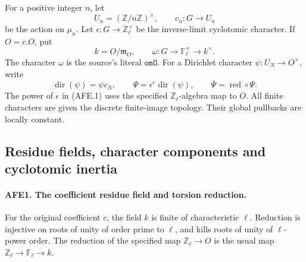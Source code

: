 For a positive integer \(n\), let
\[
 U_n=(\mathbb Z/n\mathbb Z)^\times,\qquad
 c_n:G\longrightarrow U_n
\]
be the action on \(\mu_n\).  Let
\(\epsilon:G\to\mathbb Z_\ell^\times\) be the inverse-limit
cyclotomic character.  If \(O=c.O\), put
\[
 k=O/\mathfrak m_O,\qquad
 \omega:G\longrightarrow\mathbb F_\ell^\times
                         \longrightarrow k^\times .
\]
The character \(\omega\) is the source's literal
\(\texttt{omO}\).  For a Dirichlet character
\(\psi:U_N\to O^\times\), write
\[
 \operatorname{dir}(\psi)=\psi c_N,\qquad
 \Psi=\epsilon^e\operatorname{dir}(\psi),\qquad
 \overline\Psi=\operatorname{red}\circ\Psi.
                                                        \tag{AFE.1}
\]
The power of \(\epsilon\) in (AFE.1) uses the specified
\(\mathbb Z_\ell\)-algebra map to \(O\).
All finite characters are given the discrete finite-image
topology.  Their global pullbacks are locally constant.

\subsection{Residue fields, character components and cyclotomic inertia}

\paragraph{AFE1. The coefficient residue field and torsion reduction.}
\label{claim:AFE1}
For the original coefficient \(c\), the field \(k\) is finite
of characteristic \(\ell\).  Reduction is injective on roots
of unity of order prime to \(\ell\), and kills roots of unity
of \(\ell\)-power order.  The reduction of the specified map
\(\mathbb Z_\ell\to O\) is the usual map
\(\mathbb Z_\ell\to\mathbb F_\ell\to k\).

